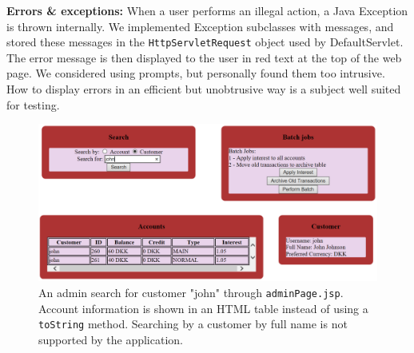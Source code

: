 \textbf{Errors \& exceptions:} When a user performs an illegal action, a Java Exception is thrown internally. We implemented Exception subclasses with messages, and stored these messages in the \texttt{HttpServletRequest} object used by DefaultServlet. The error message is then displayed to the user in red text at the top of the web page. We considered using prompts, but personally found them too intrusive. How to display errors in an efficient but unobtrusive way is a subject well suited for testing.

\begin{figure}[H]
\centering
\includegraphics[width = 1.0\textwidth]{figures/adminPage_accounts.png}
\caption{An admin search for customer "john" through \texttt{adminPage.jsp}. Account information is shown in an HTML table instead of using a \texttt{toString} method. Searching by a customer by full name is not supported by the application.}
\label{fig:table_vs_toString}
\end{figure}
